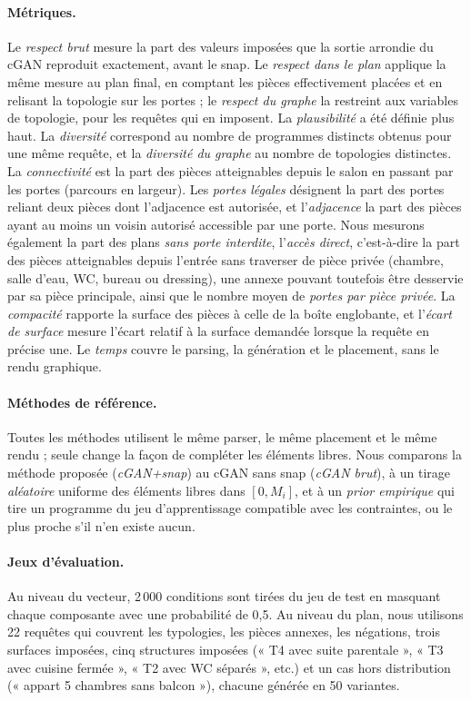 \documentclass[twocolumn]{ICCKjournal}
\begin{document}
\paragraph{Métriques.}
Le \emph{respect brut} mesure la part des valeurs imposées que la sortie
arrondie du cGAN reproduit exactement, avant le snap. Le \emph{respect
dans le plan} applique la même mesure au plan final, en comptant les
pièces effectivement placées et en relisant la topologie sur les
portes ; le \emph{respect du graphe} la restreint aux variables de
topologie, pour les requêtes qui en imposent. La \emph{plausibilité} a
été définie plus haut. La \emph{diversité} correspond au nombre de
programmes distincts obtenus pour une même requête, et la
\emph{diversité du graphe} au nombre de topologies distinctes. La
\emph{connectivité} est la part des pièces atteignables depuis le salon
en passant par les portes (parcours en largeur). Les \emph{portes
légales} désignent la part des portes reliant deux pièces dont
l'adjacence est autorisée, et l'\emph{adjacence} la part des pièces
ayant au moins un voisin autorisé accessible par une porte. Nous
mesurons également la part des plans \emph{sans porte interdite},
l'\emph{accès direct}, c'est-à-dire la part des pièces atteignables
depuis l'entrée sans traverser de pièce privée (chambre, salle d'eau,
WC, bureau ou dressing), une annexe pouvant toutefois être desservie par
sa pièce principale, ainsi que le nombre moyen de \emph{portes par pièce
privée}. La \emph{compacité} rapporte la surface des pièces à celle de
la boîte englobante, et l'\emph{écart de surface} mesure l'écart relatif
à la surface demandée lorsque la requête en précise une. Le
\emph{temps} couvre le parsing, la génération et le placement, sans le
rendu graphique.

\paragraph{Méthodes de référence.}
Toutes les méthodes utilisent le même parser, le même placement et le
même rendu ; seule change la façon de compléter les éléments libres.
Nous comparons la méthode proposée (\emph{cGAN+snap}) au cGAN sans snap
(\emph{cGAN brut}), à un tirage \emph{aléatoire} uniforme des éléments
libres dans $[0, M_i]$, et à un \emph{prior empirique} qui tire un
programme du jeu d'apprentissage compatible avec les contraintes, ou le
plus proche s'il n'en existe aucun.

\paragraph{Jeux d'évaluation.}
Au niveau du vecteur, 2\,000 conditions sont tirées du jeu de test en
masquant chaque composante avec une probabilité de 0,5. Au niveau du
plan, nous utilisons 22 requêtes qui couvrent les typologies, les pièces
annexes, les négations, trois surfaces imposées, cinq structures
imposées (« T4 avec suite parentale », « T3 avec cuisine fermée »,
« T2 avec WC séparés », etc.) et un cas hors distribution (« appart 5
chambres sans balcon »), chacune générée en 50 variantes.
\end{document}
